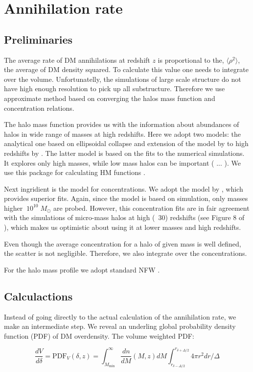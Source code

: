\section{Annihilation rate}

\subsection{Preliminaries}

The average rate of DM annihilations at redshift $z$ is proportional to the, $\langle \rho^2 \rangle$, the average of DM density squared. To calculate this value one needs to integrate over the volume. Unfortunatelly, the simulations of large scale structure do not have high enough resolution to pick up all substructure. Therefore we use approximate method based on converging the halos mass function and concentration relations.

The halo mass function provides us with the information about abundances of halos in wide range of masses at high redshifts. Here we adopt two models: the analytical one based on ellipsoidal collapse \cite{Sheth_2001} and extension of the model by \cite{Tinker_2008} to high redshifts by \cite{Behroozi_2013}. The latter model is based on the fits to the numerical simulations. It explores only high masses, while low mass halos can be important ( ... ). We use this package for calculating HM functions \cite{Murray_2013}.

Next ingridient is the model for concentrations. We adopt the model by \cite{2014arXiv1407.4730D}, which provides superior fits. Again, since the model is based on simulation, only masses higher $~10^{10}\;M_\odot$ are probed. However, this concentration fits are in fair agreement with the simulations of micro-mass halos at high (~30) redshifts (see Figure 8 of \cite{2014arXiv1407.4730D}), which makes us optimistic about using it at lower masses and high redshifts.

Even though the average concentration for a halo of given mass is well defined, the scatter is not negligible. Therefore, we also integrate over the concentrations.

For the halo mass profile we adopt standard NFW \cite{1997ApJ...490..493N}. 

\subsection{Calculactions}
Instead of going directly to the actual calculation of the annihilation rate, we make an intermediate step. We reveal an underling global probability density function (PDF) of DM overdensity. The volume weighted PDF:

\begin{equation}
\dfrac{dV}{d\delta}=\mathrm{PDF}_V (\delta, z) = \int_{M_\mathrm{min}}^\infty \dfrac{dn}{dM}(M,z) dM \int_{r_{\delta-\Delta/2}}^{r_{\delta+\Delta/2}} 4\pi r^2 dr / \Delta
\end{equation}


